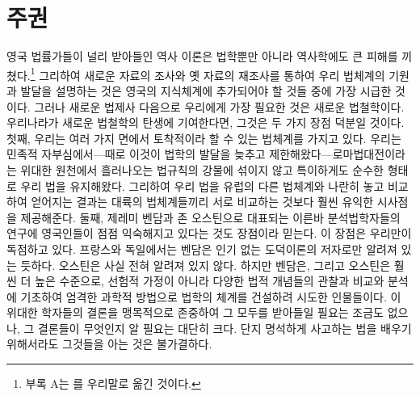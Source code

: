 \chapter{주권}

영국 법률가들이 널리 받아들인 역사 이론은
법학뿐만 아니라 역사학에도
큰 피해를 끼쳤다.\footnote{%
  부록 A는 를
  우리말로 옮긴 것이다. }
그리하여
새로운 자료의 조사와 옛 자료의 재조사를 통하여
우리 법체계의 기원과 발달을 설명하는 것은
영국의 지식체계에 추가되어야 할 것들 중에 가장 시급한 것이다.
그러나 새로운 법제사 다음으로 우리에게 가장 필요한 것은
새로운 법철학이다.
우리나라가 새로운 법철학의 탄생에 기여한다면,
그것은 두 가지 장점 덕분일 것이다.
첫째,
우리는 여러 가지 면에서 토착적이라 할 수 있는 법체계를 가지고 있다.
우리는 민족적 자부심에서---때로 이것이 법학의 발달을 늦추고
제한해왔다---로마법대전이라는 위대한 원천에서
흘러나오는 법규칙의 강물에 섞이지 않고 특이하게도 순수한 형태로
우리 법을 유지해왔다. 그리하여
우리 법을 유럽의 다른 법체계와 나란히 놓고 비교하여 얻어지는 결과는
대륙의 법체계들끼리 서로 비교하는 것보다
훨씬 유익한 시사점을 제공해준다.
둘째,
제레미 벤담과 존 오스틴으로 대표되는
이른바 분석법학자들의 연구에 영국인들이 점점 익숙해지고 있다는 것도
장점이라 믿는다.
이 장점은 우리만이 독점하고 있다.
프랑스와 독일에서는
벤담은
인기 없는 도덕이론의 저자로만 알려져 있는 듯하다.
오스틴은 사실 전혀 알려져 있지 않다.
하지만
벤담은, 그리고 오스틴은 훨씬 더 높은 수준으로,
선험적 가정이 아니라 다양한 법적 개념들의 관찰과 비교와 분석에 기초하여
엄격한 과학적 방법으로 법학의 체계를 건설하려 시도한 인물들이다.
이 위대한 학자들의 결론을 맹목적으로 존중하여
그 모두를 받아들일 필요는 조금도 없으나,
그 결론들이 무엇인지 알 필요는 대단히 크다.
단지 명석하게 사고하는 법을 배우기 위해서라도 그것들을 아는 것은 불가결하다.

